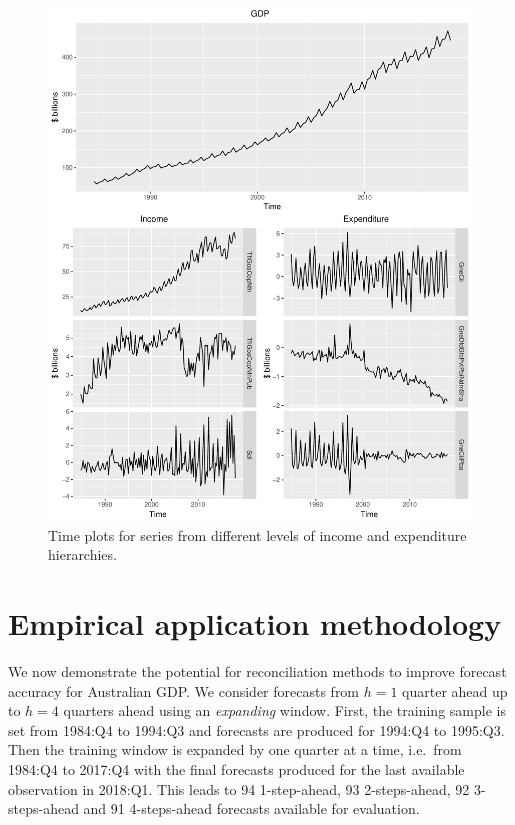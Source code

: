 \documentclass[a4paper, 11pt]{article}
\begin{document}
\begin{figure}
	\centering
	\small
	\includegraphics[width = \textwidth]{Figs/TS-plots/TSplots-INC-EXP.pdf}
	\caption{Time plots for series from different levels of income and expenditure hierarchies.}\label{fig:TSplots-INC-EXP}
\end{figure}

\section{Empirical application methodology}\label{sec:meth}

We now demonstrate the potential for reconciliation methods to improve forecast accuracy for Australian GDP\@. We consider forecasts from $h=1$ quarter ahead up to $h=4$ quarters ahead using an \emph{expanding} window. First, the training sample is set from 1984:Q4 to 1994:Q3 and forecasts are produced for 1994:Q4 to 1995:Q3. Then the training window is expanded by one quarter at a time, i.e.\ from 1984:Q4 to 2017:Q4 with the final forecasts produced for the last available observation in 2018:Q1. This leads to 94 1-step-ahead, 93 2-steps-ahead, 92 3-steps-ahead and 91 4-steps-ahead forecasts available for evaluation.
\end{document}
